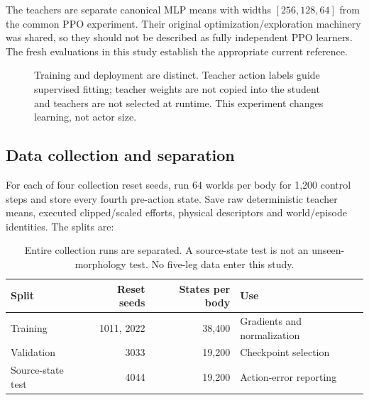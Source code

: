 \documentclass[11pt,letterpaper]{article}
\newcommand{\state}{s}
\begin{document}
The teachers are separate canonical MLP means with widths $[256,128,64]$ from the
common PPO experiment. Their original optimization/exploration machinery was
shared, so they should not be described as fully independent PPO learners. The
fresh evaluations in this study establish the appropriate current reference.

\begin{figure}[htbp]
\centering
{}
\caption{Training and deployment are distinct. Teacher action labels guide
supervised fitting; teacher weights are not copied into the student and teachers
are not selected at runtime. This experiment changes learning, not actor size.}
\label{fig:distillation}
\end{figure}

\subsection{Data collection and separation}
For each of four collection reset seeds, run 64 worlds per body for 1,200 control
steps and store every fourth pre-action state. Save raw deterministic teacher
means, executed clipped/scaled efforts, physical descriptors and world/episode
identities. The splits are:
\begin{table}[htbp]
\centering
\begin{tabular}{@{}lrrl@{}}
\toprule
Split & Reset seeds & States per body & Use\\
\midrule
Training & 1011, 2022 & 38,400 & Gradients and normalization\\
Validation & 3033 & 19,200 & Checkpoint selection\\
Source-state test & 4044 & 19,200 & Action-error reporting\\
\bottomrule
\end{tabular}
\caption{Entire collection runs are separated. A source-state test is not an
unseen-morphology test. No five-leg data enter this study.}
\end{table}
\end{document}

